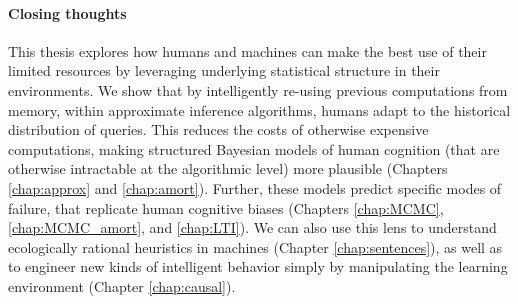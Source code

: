 

\paragraph{Closing thoughts}

This thesis explores how humans and machines can make the best use of their limited resources by leveraging underlying statistical structure in their environments. We show that by intelligently re-using previous computations from memory, within approximate inference algorithms, humans adapt to the historical distribution of queries. This reduces the costs of otherwise expensive computations, making structured Bayesian models of human cognition (that are otherwise intractable at the algorithmic level) more plausible (Chapters \ref{chap:approx} and \ref{chap:amort}). Further, these models predict specific modes of failure, that replicate human cognitive biases (Chapters \ref{chap:MCMC}, \ref{chap:MCMC_amort}, and \ref{chap:LTI}). We can also use this lens to understand ecologically rational heuristics in machines (Chapter \ref{chap:sentences}), as well as to engineer new kinds of intelligent behavior simply by manipulating the learning environment (Chapter \ref{chap:causal}).

